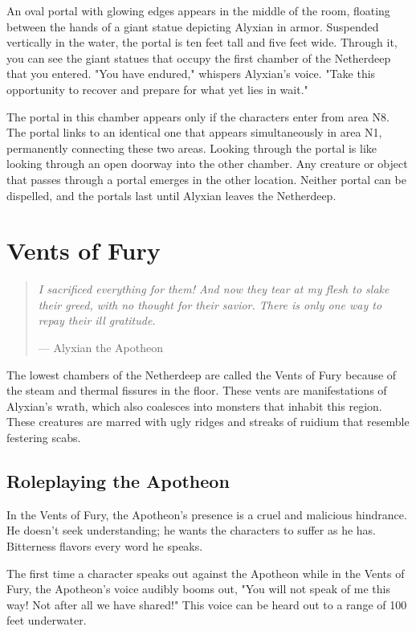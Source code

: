 \documentclass[letterpaper, 11pt, bg=full, twocolumn]{dndbook}
\begin{document}
\begin{DndReadAloud}
An oval portal with glowing edges appears in the middle of the room, floating between the hands of a giant statue depicting Alyxian in armor. Suspended vertically in the water, the portal is ten feet tall and five feet wide. Through it, you can see the giant statues that occupy the first chamber of the Netherdeep that you entered.
"You have endured," whispers Alyxian's voice. "Take this opportunity to recover and prepare for what yet lies in wait."
\end{DndReadAloud}

The portal in this chamber appears only if the characters enter from area N8. The portal links to an identical one that appears simultaneously in area N1, permanently connecting these two areas. Looking through the portal is like looking through an open doorway into the other chamber. Any creature or object that passes through a portal emerges in the other location. Neither portal can be dispelled, and the portals last until Alyxian leaves the Netherdeep.
\section{Vents of Fury}

\begin{quotation}
\em
I sacrificed everything for them! And now they tear at my flesh to slake their greed, with no thought for their savior. There is only one way to repay their ill gratitude.

\hfill --- Alyxian the Apotheon
\end{quotation}

The lowest chambers of the Netherdeep are called the Vents of Fury because of the steam and thermal fissures in the floor. These vents are manifestations of Alyxian's wrath, which also coalesces into monsters that inhabit this region. These creatures are marred with ugly ridges and streaks of ruidium that resemble festering scabs.

\subsection{Roleplaying the Apotheon}

In the Vents of Fury, the Apotheon's presence is a cruel and malicious hindrance. He doesn't seek understanding; he wants the characters to suffer as he has. Bitterness flavors every word he speaks.

The first time a character speaks out against the Apotheon while in the Vents of Fury, the Apotheon's voice audibly booms out, "You will not speak of me this way! Not after all we have shared!" This voice can be heard out to a range of 100 feet underwater.
\end{document}
